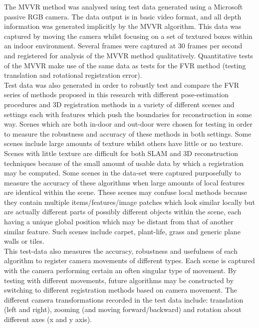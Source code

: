 The MVVR method was analysed using test data generated using a Microsoft passive RGB camera. The data output is in basic video format, and all depth information was generated implicitly by the MVVR algorithm. This data was captured by moving the camera whilst focusing on a set of textured boxes within an indoor environment. Several frames were captured at 30 frames per second and registered for analysis of the MVVR method qualitatively. Quantitative tests of the MVVR make use of the same data as tests for the FVR method (testing translation and rotational registration error). \\

Test data was also generated in order to robustly test and compare the FVR series of methods proposed in this research with different pose-estimation procedures and 3D registration methods in a variety of different scenes and settings each with features which push the boundaries for reconstruction in some way. Scenes which are both in-door and out-door were chosen for testing in order to measure the robustness and accuracy of these methods in both settings. Some scenes include large amounts of texture whilst others have little or no texture. Scenes with little texture are difficult for both SLAM and 3D reconstruction techniques because of the small amount of usable data by which a registration may be computed. Some scenes in the data-set were captured purposefully to measure the accuracy of these algorithms when large amounts of local features are identical within the scene. These scenes may confuse local methods because they contain multiple items/features/image patches which look similar locally but are actually different parts of possibly different objects within the scene, each having a unique global position which may be distant from that of another similar feature. Such scenes include carpet, plant-life, grass and generic plane walls or tiles. \\

This test-data also measures the accuracy, robustness and usefulness of each algorithm to register camera movements of different types. Each scene is captured with the camera performing certain an often singular type of movement. By testing with different movements, future algorithms may be constructed by switching to different registration methods based on camera movement. The different camera transformations recorded in the test data include: translation (left and right), zooming (and moving forward/backward) and rotation about different axes (x and y axis). \\

